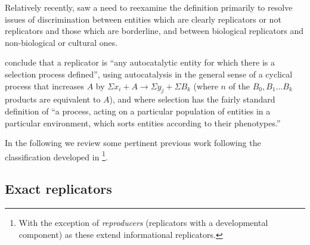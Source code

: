 %
%

Relatively recently, \textcite{Zachar2010} saw a need to reexamine the definition primarily to resolve issues of discrimination between entities which are clearly replicators or not replicators and those which are borderline, and between biological replicators and non-biological or cultural ones. 


\Textcite{Zachar2010} conclude that a replicator is ``any autocatalytic entity for which there is a selection process defined'', using autocatalysis in the general sense of a cyclical process that increases $A$ by $\Sigma x_i + A\rightarrow \Sigma y_j + \Sigma B_k$ (where $n$ of the ${B_0, B_1...B_k}$ products are equivalent to $A$), and where selection has the fairly standard definition of ``a process, acting on a particular population of entities in a particular environment, which sorts entities according to their phenotypes.'' \parencite[p.21]{Zachar2010}

In the following  we review some pertinent previous work following the classification developed in \textcite{Zachar2010}\footnote{With the exception of \emph{reproducers} (replicators with a developmental component) as these extend informational replicators.}.

\subsection{Exact replicators}\label{non-informational-exact-replicators}

